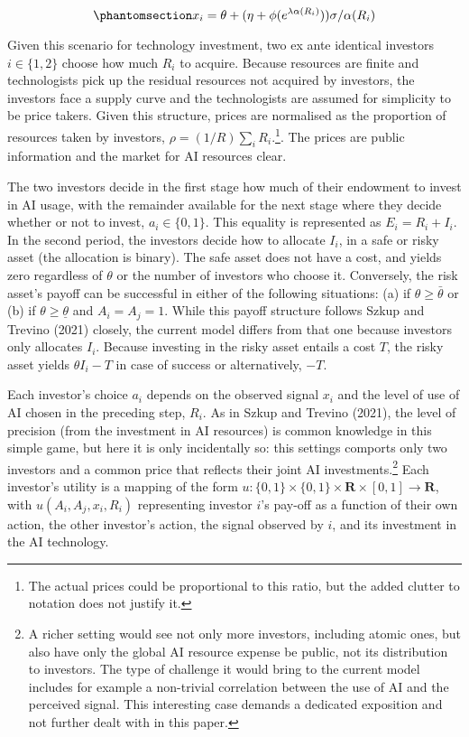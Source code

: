 \documentclass[
]{article}
\theoremstyle{plain}
\theoremstyle{remark}
\begin{document}
\begin{equation}\phantomsection\label{eq-privatesignals}{
x_i = \theta + (\eta + \phi(e^{\lambda \alpha(R_i)})) \sigma / \alpha(R_i)
}\end{equation}

Given this scenario for technology investment, two ex ante identical
investors \(i \in \{1,2\}\) choose how much \(R_i\) to acquire. Because
resources are finite and technologists pick up the residual resources
not acquired by investors, the investors face a supply curve and the
technologists are assumed for simplicity to be price takers. Given this
structure, prices are normalised as the proportion of resources taken by
investors, \(\rho = (1/R)\sum_i R_i\).\footnote{The actual prices could
  be proportional to this ratio, but the added clutter to notation does
  not justify it.}. The prices are public information and the market for
AI resources clear.

The two investors decide in the first stage how much of their endowment
to invest in AI usage, with the remainder available for the next stage
where they decide whether or not to invest, \(a_i \in \{0, 1\}\). This
equality is represented as \(E_i = R_i + I_i\). In the second period,
the investors decide how to allocate \(I_i\), in a safe or risky asset
(the allocation is binary). The safe asset does not have a cost, and
yields zero regardless of \(\theta\) or the number of investors who
choose it. Conversely, the risk asset's payoff can be successful in
either of the following situations: (a) if \(\theta \geq \bar{\theta}\)
or (b) if \(\theta \geq \underline{\theta}\) and \(A_i = A_j = 1\).
While this payoff structure follows Szkup and Trevino (2021) closely,
the current model differs from that one because investors only allocates
\(I_i\). Because investing in the risky asset entails a cost \(T\), the
risky asset yields \(\theta I_i - T\) in case of success or
alternatively, \(-T\).

Each investor's choice \(a_i\) depends on the observed signal \(x_i\)
and the level of use of AI chosen in the preceding step, \(R_i\). As in
Szkup and Trevino (2021), the level of precision (from the investment in
AI resources) is common knowledge in this simple game, but here it is
only incidentally so: this settings comports only two investors and a
common price that reflects their joint AI investments.\footnote{A richer
  setting would see not only more investors, including atomic ones, but
  also have only the global AI resource expense be public, not its
  distribution to investors. The type of challenge it would bring to the
  current model includes for example a non-trivial correlation between
  the use of AI and the perceived signal. This interesting case demands
  a dedicated exposition and not further dealt with in this paper.} Each
investor's utility is a mapping of the form
\(u : \{0, 1\} \times \{0, 1\} \times \mathbf{R} \times [0, 1] \to \mathbf{R}\),
with \(u(A_i, A_j, x_i, R_i)\) representing investor \(i\)'s pay-off as
a function of their own action, the other investor's action, the signal
observed by \(i\), and its investment in the AI technology.
\end{document}
